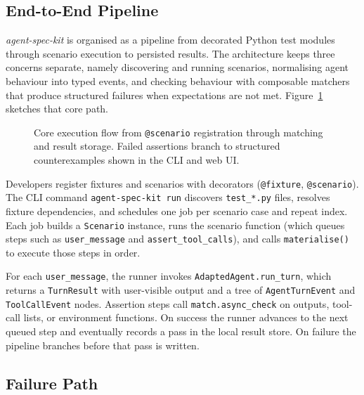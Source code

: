 \subsection{End-to-End Pipeline}

\emph{agent-spec-kit} is organised as a pipeline from decorated Python test modules through scenario execution to persisted results. The architecture keeps three concerns separate, namely discovering and running scenarios, normalising agent behaviour into typed events, and checking behaviour with composable matchers that produce structured failures when expectations are not met. Figure~\ref{fig:methodology-architecture} sketches that core path.

\begin{figure}[htbp]
  \centering
  \resizebox{0.68\textwidth}{!}{%
  }
  \caption{Core execution flow from \texttt{@scenario} registration through matching and result storage. Failed assertions branch to structured counterexamples shown in the CLI and web UI.}
  \label{fig:methodology-architecture}
\end{figure}

Developers register fixtures and scenarios with decorators (\texttt{@fixture}, \texttt{@scenario}). The CLI command \texttt{agent-spec-kit run} discovers \texttt{test\_*.py} files, resolves fixture dependencies, and schedules one job per scenario case and repeat index. Each job builds a \texttt{Scenario} instance, runs the scenario function (which queues steps such as \texttt{user\_message} and \texttt{assert\_tool\_calls}), and calls \texttt{materialise()} to execute those steps in order.

For each \texttt{user\_message}, the runner invokes \texttt{AdaptedAgent.run\_turn}, which returns a \texttt{TurnResult} with user-visible output and a tree of \texttt{AgentTurnEvent} and \texttt{ToolCallEvent} nodes. Assertion steps call \texttt{match.async\_check} on outputs, tool-call lists, or environment functions. On success the runner advances to the next queued step and eventually records a pass in the local result store. On failure the pipeline branches before that pass is written.

\subsection{Failure Path}

